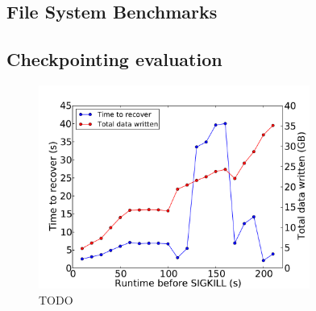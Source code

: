 \subsection{File System Benchmarks}


\subsection{Checkpointing evaluation}
\begin{figure}
  \centering
   \includegraphics[width=3.5in]{figures/checkpointing.pdf}
   \caption{TODO}
   \label{fig:checkpointing}
\end{figure}